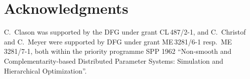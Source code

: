 \documentclass[reqno]{shinyart}
\begin{document}
\section*{Acknowledgments}
C.~Clason was supported by the DFG under grant CL\,487/2-1, and
C.~Christof and C.~Meyer were supported by DFG under grant ME\,3281/6-1 resp.~ME\,3281/7-1, both within the priority programme SPP 1962 ``Non-smooth and Complementarity-based Distributed Parameter Systems: Simulation and Hierarchical Optimization''.

\printbibliography
\end{document}

